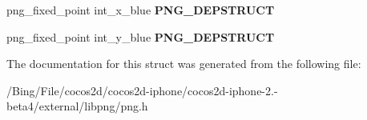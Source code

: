 \begin{DoxyCompactItemize}
\item 
\hypertarget{structpng__info__struct_a97f53728858a190792c786fd5cae5686}{png\-\_\-fixed\-\_\-point int\-\_\-x\-\_\-blue {\bfseries P\-N\-G\-\_\-\-D\-E\-P\-S\-T\-R\-U\-C\-T}}\label{structpng__info__struct_a97f53728858a190792c786fd5cae5686}

\item 
\hypertarget{structpng__info__struct_aba85bee37b3777fedceb9daf123ca060}{png\-\_\-fixed\-\_\-point int\-\_\-y\-\_\-blue {\bfseries P\-N\-G\-\_\-\-D\-E\-P\-S\-T\-R\-U\-C\-T}}\label{structpng__info__struct_aba85bee37b3777fedceb9daf123ca060}

\end{DoxyCompactItemize}


The documentation for this struct was generated from the following file\-:\begin{DoxyCompactItemize}
\item 
/\-Bing/\-File/cocos2d/cocos2d-\/iphone/cocos2d-\/iphone-\/2.-\/beta4/external/libpng/png.\-h\end{DoxyCompactItemize}

